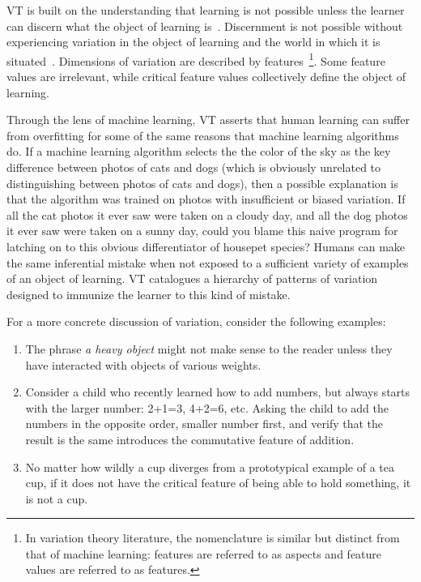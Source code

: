 VT is built on the understanding that learning is not possible unless the learner can discern what the object of learning is~\cite{marton1997learning}. Discernment is not possible without experiencing variation in the object of learning and the world in which it is situated~\cite{marton2004classroom}. Dimensions of variation are described by features~\cite{ling2012variation}\footnote{In variation theory literature, the nomenclature is similar but distinct from that of machine learning: features are referred to as aspects and feature values are referred to as features.}. Some feature values are irrelevant, while critical feature values collectively define the object of learning.

Through the lens of machine learning, VT asserts that human learning can suffer from overfitting for some of the same reasons that machine learning algorithms do. If a machine learning algorithm selects the the color of the sky as the key difference between photos of cats and dogs (which is obviously unrelated to distinguishing between photos of cats and dogs), then a possible explanation is that the algorithm was trained on photos with insufficient or biased variation. If all the cat photos it ever saw were taken on a cloudy day, and all the dog photos it ever saw were taken on a sunny day, could you blame this naive program for latching on to this obvious differentiator of housepet species? Humans can make the same inferential mistake when not exposed to a sufficient variety of examples of an object of learning. VT catalogues a hierarchy of patterns of variation designed to immunize the learner to this kind of mistake.


For a more concrete discussion of variation, consider the following examples:
\begin{enumerate}
\item The phrase {\it a heavy object} might not make sense to the reader unless they have interacted with objects of various weights.
\item Consider a child who recently learned how to add numbers, but always starts with the larger number: 2+1=3, 4+2=6, etc. Asking the child to add the numbers in the opposite order, smaller number first, and verify that the result is the same introduces the commutative feature of addition.
\item No matter how wildly a cup diverges from a prototypical example of a tea cup, if it does not have the critical feature of being able to hold something, it is not a cup.
\end{enumerate}

